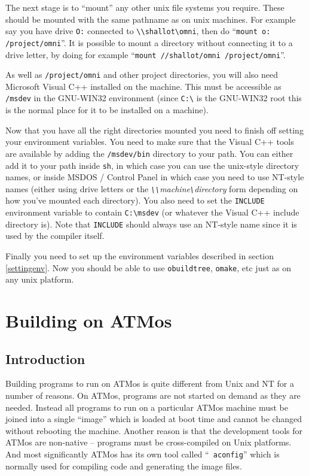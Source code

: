 \documentclass[11pt,twoside,onecolumn]{article}
\begin{document}
The next stage is to ``mount'' any other unix file systems you require.  These
should be mounted with the same pathname as on unix machines.  For example say
you have drive \verb|O:| connected to \verb|\\shallot\omni|, then do
``\verb|mount o: /project/omni|''.  It is possible to mount a directory without
connecting it to a drive letter, by doing for example
``\verb|mount //shallot/omni /project/omni|''.

As well as \verb|/project/omni| and other project directories, you will also
need Microsoft Visual C++ installed on the machine.  This must be accessible as
\verb|/msdev| in the GNU-WIN32 environment (since \verb|C:\| is the GNU-WIN32
root this is the normal place for it to be installed on a machine).

Now that you have all the right directories mounted you need to finish off
setting your environment variables.  You need to make sure that the Visual C++
tools are available by adding the \verb|/msdev/bin| directory to your path.
You can either add it to your path inside {\tt sh}, in which case you can use
the unix-style directory names, or inside MSDOS / Control Panel in which case
you need to use NT-style names (either using drive letters or the {\it
\verb|\\|machine\verb|\|directory} form depending on how you've mounted each
directory).  You also need to set the {\tt INCLUDE} environment variable to
contain \verb|C:\msdev| (or whatever the Visual C++ include directory
is).  Note that {\tt INCLUDE} should always use an NT-style name since it is
used by the compiler itself.

Finally you need to set up the environment variables described in section
\ref{settingenv}.  Now you should be able to use {\tt obuildtree}, {\tt omake},
etc just as on any unix platform.

\section{Building on ATMos}

\subsection{Introduction}

Building programs to run on ATMos is quite different from Unix and NT for a
number of reasons.  On ATMos, programs are not started on demand as they are
needed.  Instead all programs to run on a particular ATMos machine must be
joined into a single ``image'' which is loaded at boot time and cannot be
changed without rebooting the machine.  Another reason is that the development
tools for ATMos are non-native -- programs must be cross-compiled on Unix
platforms.  And most significantly ATMos has its own tool called ``{\tt
aconfig}'' which is normally used for compiling code and generating the image
files.
\end{document}
